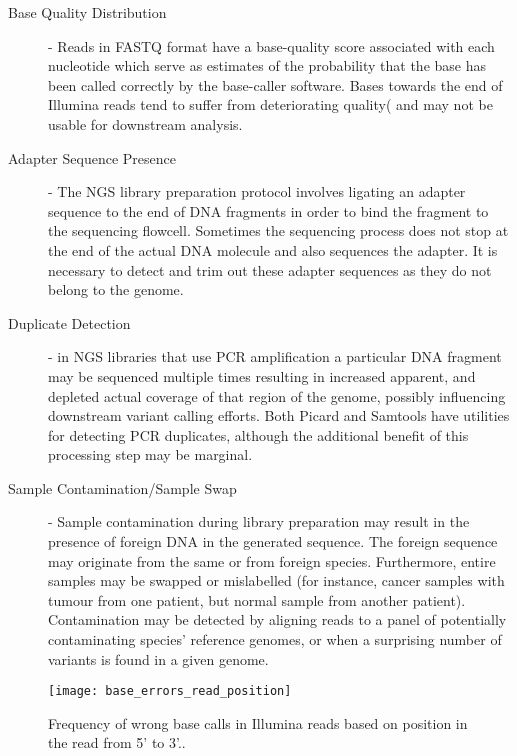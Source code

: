 \begin{description}
    \item [Base Quality Distribution] - Reads in FASTQ format have a base-quality score associated with each nucleotide which serve as estimates of the probability that the base has been called correctly by the base-caller software. Bases towards the end of Illumina reads tend to suffer from deteriorating quality(\autocite{dohm2008substantial} and may not be usable for downstream analysis. 
    \item [Adapter Sequence Presence] - The NGS library preparation protocol involves ligating an adapter sequence to the end of DNA fragments in order to bind the fragment to the sequencing flowcell. Sometimes the sequencing process does not stop at the end of the actual DNA molecule and also sequences the adapter. It is necessary to detect and trim out these adapter sequences as they do not belong to the genome\autocite{bolger2014trimmomatic}.
    \item [Duplicate Detection] - in NGS libraries that use PCR amplification a particular DNA fragment may be sequenced multiple times resulting in increased apparent, and depleted actual coverage of that region of the genome, possibly influencing downstream variant calling efforts. Both Picard\autocite{Picard2018toolkit} and Samtools\autocite{li2011statistical} have utilities for detecting PCR duplicates, although the additional benefit of this processing step may be marginal\autocite{ebbert2016evaluating}.
    \item [Sample Contamination/Sample Swap] - Sample contamination during library preparation may result in the presence of foreign DNA in the generated sequence. The foreign sequence may originate from the same or from foreign species. Furthermore, entire samples may be swapped or mislabelled (for instance, cancer samples with tumour from one patient, but normal sample from another patient). Contamination may be detected by aligning reads to a panel of potentially contaminating species' reference genomes\autocite{zhou2013qc}, or when a surprising number of variants is found in a given genome.
\end{description}

\begin{figure}[h!]
    \texttt{[image: base\_errors\_read\_position]}
    \centering
    \caption {Frequency of wrong base calls in Illumina reads based on position in the read from 5' to 3'.\autocite{dohm2008substantial}.}
    \label{fig:base_errors_read_position}
\end{figure}

